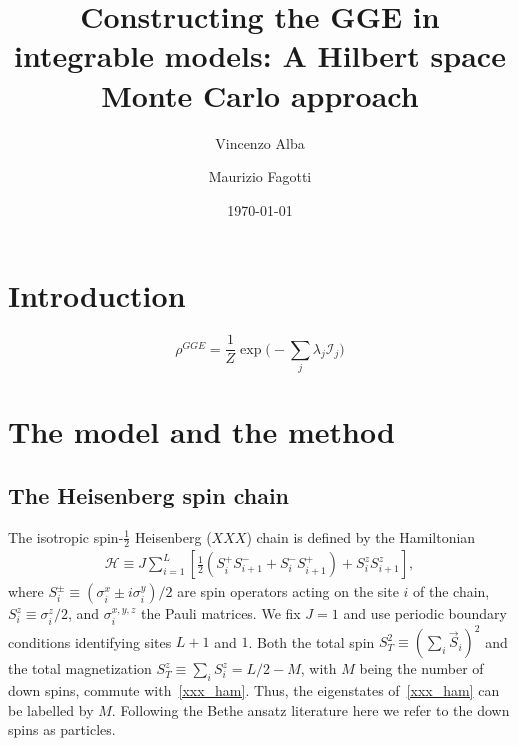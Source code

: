 \documentclass[twocolumn,superscriptaddress,prb,10pt]{revtex4-1}
\begin{document}
\title{Constructing the GGE in integrable models: A Hilbert space Monte Carlo 
approach} 

\author{Vincenzo Alba}

\author{Maurizio Fagotti}

\date{\today}




\begin{abstract} 


\end{abstract}


\maketitle


\section{Introduction}


%
\begin{equation}
\rho^{GGE}=\frac{1}{Z}\exp\Big(-\sum_j\lambda_j{\mathcal I}_j\Big)
\label{gge}
\end{equation}
%

\section{The model and the method}

\subsection{The Heisenberg spin chain}

The isotropic spin-$\frac{1}{2}$ Heisenberg ($XXX$) chain is defined by the 
Hamiltonian 
%
\begin{align}
\label{xxx_ham}
{\mathcal H}\equiv J\sum\limits_{i=1}^L\left[\frac{1}{2}(S_i^+S^-_{i+1} 
+S_i^{-}S_{i+1}^+)+S_i^zS_{i+1}^z\right],  
\end{align}
%
where $S^{\pm}_i\equiv (\sigma_i^x\pm i\sigma_i^y)/2$ are spin operators 
acting on the site $i$ of the chain, $S_i^z\equiv\sigma_i^z/2$, and 
$\sigma^{x,y,z}_i$ the Pauli matrices. We fix $J=1$ and use periodic 
boundary conditions identifying sites $L+1$ and $1$. 
Both the total spin $S_T^2\equiv(\sum_i \vec S_i)^2$ and the total 
magnetization $S_{T}^z\equiv\sum_iS_i^z=L/2-M$, with $M$ being the 
number of down spins, commute with~\eqref{xxx_ham}. Thus, the 
eigenstates of~\eqref{xxx_ham} can be labelled by $M$. Following the 
Bethe ansatz literature here we refer to the down spins as particles. 
\end{document}
